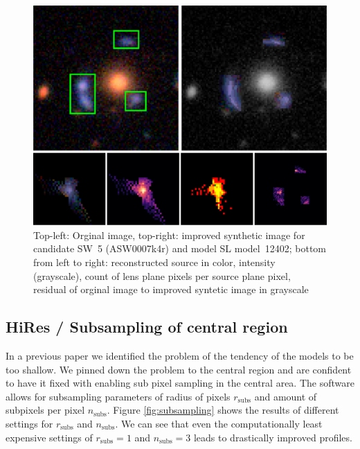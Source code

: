 \documentclass[fleqn,usenatbib]{mnras}
\newcommand{\asw}[1]{ASW000#1}
\newcommand{\sw}[1]{SW~#1}
\newcommand{\model}[1]{SL model~#1}
\newcommand{\figref}[1]{Figure \ref{fig:#1}}
\begin{document}
\begin{figure}
  \includegraphics[width=\linewidth]{img/new_synth_img_detailed}
  \caption{
      Top-left: Orginal image, top-right: improved synthetic image for candidate \sw{5} (\asw{7k4r}) and model \model{12402};
      bottom from left to right:
        reconstructed source in color,
        intensity (grayscale),
        count of lens plane pixels per source plane pixel,
        residual of orginal image to improved syntetic image in grayscale
    }
  \label{fig:synthimg}
\end{figure}

\subsection{HiRes / Subsampling of central region}
In a previous paper \cite{2015MNRAS.447.2170K} we identified the problem of the tendency of the models to be too shallow.
We pinned down the problem to the central region and are confident to have it fixed with enabling sub pixel sampling in the central area.
The software allows for subsampling parameters of radius of pixels $r_\text{subs}$ and amount of subpixels per pixel $n_\text{subs}$.
\figref{subsampling} shows the results of different settings for $r_\text{subs}$ and $n_\text{subs}$.
We can see that even the computationally least expensive settings of $r_\text{subs}=1$ and $n_\text{subs}=3$ leads to drastically improved profiles.
\end{document}
